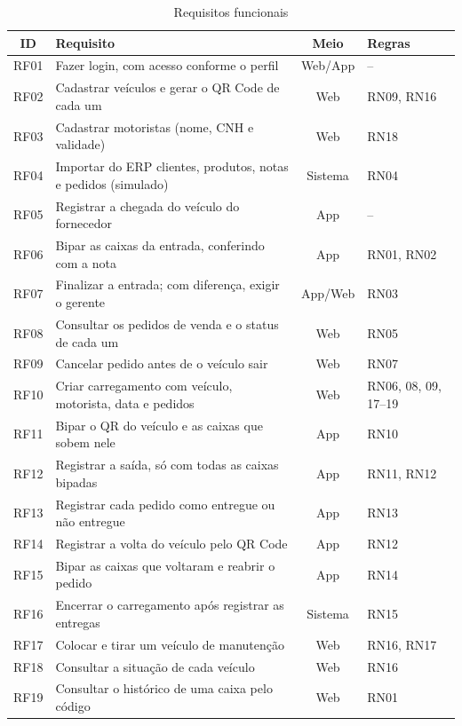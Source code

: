 \begin{table}[htbp]
\centering
\caption{Requisitos funcionais}
\label{tab:rf}
\footnotesize
\begin{tabular}{|c|p{9cm}|c|p{2.6cm}|}
\hline
\textbf{ID} & \textbf{Requisito} & \textbf{Meio} & \textbf{Regras} \\ \hline
RF01 & Fazer login, com acesso conforme o perfil & Web/App & -- \\ \hline
RF02 & Cadastrar veículos e gerar o QR Code de cada um & Web & RN09, RN16 \\ \hline
RF03 & Cadastrar motoristas (nome, CNH e validade) & Web & RN18 \\ \hline
RF04 & Importar do ERP clientes, produtos, notas e pedidos (simulado) & Sistema & RN04 \\ \hline
RF05 & Registrar a chegada do veículo do fornecedor & App & -- \\ \hline
RF06 & Bipar as caixas da entrada, conferindo com a nota & App & RN01, RN02 \\ \hline
RF07 & Finalizar a entrada; com diferença, exigir o gerente & App/Web & RN03 \\ \hline
RF08 & Consultar os pedidos de venda e o status de cada um & Web & RN05 \\ \hline
RF09 & Cancelar pedido antes de o veículo sair & Web & RN07 \\ \hline
RF10 & Criar carregamento com veículo, motorista, data e pedidos & Web & RN06, 08, 09, 17--19 \\ \hline
RF11 & Bipar o QR do veículo e as caixas que sobem nele & App & RN10 \\ \hline
RF12 & Registrar a saída, só com todas as caixas bipadas & App & RN11, RN12 \\ \hline
RF13 & Registrar cada pedido como entregue ou não entregue & App & RN13 \\ \hline
RF14 & Registrar a volta do veículo pelo QR Code & App & RN12 \\ \hline
RF15 & Bipar as caixas que voltaram e reabrir o pedido & App & RN14 \\ \hline
RF16 & Encerrar o carregamento após registrar as entregas & Sistema & RN15 \\ \hline
RF17 & Colocar e tirar um veículo de manutenção & Web & RN16, RN17 \\ \hline
RF18 & Consultar a situação de cada veículo & Web & RN16 \\ \hline
RF19 & Consultar o histórico de uma caixa pelo código & Web & RN01 \\ \hline
\end{tabular}
\end{table}

